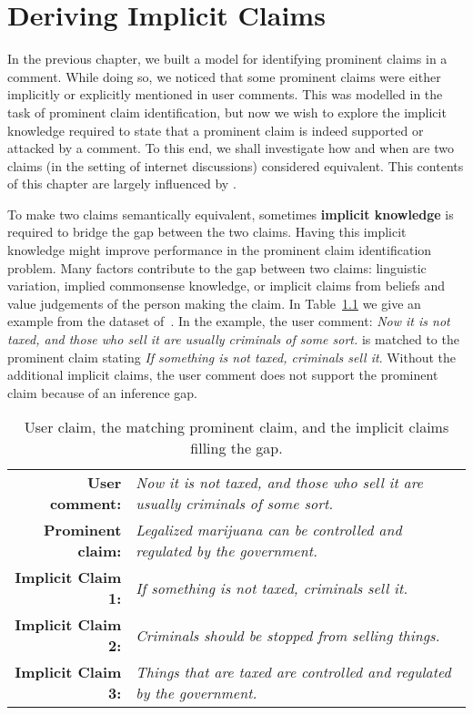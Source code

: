 \chapter{Deriving Implicit Claims}
\label{chap:deriving_implicit}

In the previous chapter, we built a model for identifying 
prominent claims in a comment. While doing so, we noticed that 
some prominent claims were either implicitly or explicitly mentioned
in user comments. This was modelled in the task of prominent claim
identification, but now we wish to explore the implicit knowledge required
to state that a prominent claim is indeed supported or attacked by a comment.
To this end, we shall investigate how and when are two claims
(in the setting of internet discussions) considered equivalent. 
This contents of this chapter are largely influenced by \citep{boltuzic2016fill}.

To make two claims semantically equivalent, sometimes \textbf{implicit knowledge} is
required to bridge the gap between the two claims. 
Having this implicit knowledge might improve performance in the 
prominent claim identification problem. 
Many factors contribute to the gap between two claims: linguistic variation,
implied commonsense knowledge, or implicit claims from beliefs and value
judgements of the person making the claim. In Table~\ref{tab:premise_example} we
give an example from the dataset of~\citet{hasan2014you}. 
In the example, the user comment: 
\emph{Now it is not taxed, and those who sell it are usually criminals of some sort.}
is matched to  the prominent claim stating
\emph{If something is not taxed, criminals sell it}.
Without the additional implicit claims, the user comment does not support the prominent 
claim because of an inference gap. 


\begin{table}
{\normalsize
\begin{tabular}{|@{\ }r@{\ \  }p{}|}
\hline
\textbf{User comment:} & \emph{Now it is not taxed, and those who sell it are
	usually criminals of some sort.}\\
\textbf{Prominent claim:} & \emph{Legalized marijuana can be controlled and
	regulated by the government.}\\
\textbf{Implicit Claim 1:} & \emph{If something is not taxed, criminals sell
	it.}\\
\textbf{Implicit Claim 2:} & \emph{Criminals should be stopped from selling
	things.}\\
\textbf{Implicit Claim 3:} & \emph{Things that are taxed are controlled and
	regulated by the government.}\\
\hline
\end{tabular}}
\caption{User claim, the matching prominent claim, and the implicit claims filling the gap.}
\label{tab:premise_example}
\end{table}

